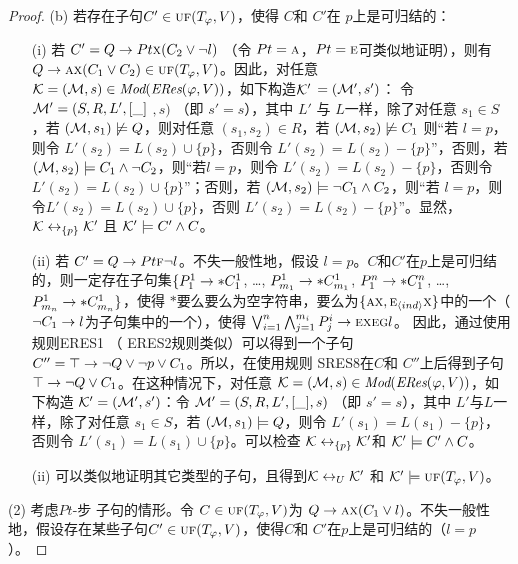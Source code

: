 \begin{proof}
	(b) 若存在子句$C'\in \textsc{uf}(T_\varphi,V)$，使得 $C$和 $C'$在 $p$上是可归结的：
	\begin{itemize}
		\item[(i)] 若 $C'= Q\rightarrow Pt \textsc{x} (C_2 \vee \neg l)$ （令 $Pt=\textsc{a}$，$Pt = \textsc{e}$可类似地证明），则有$Q\rightarrow \textsc{a} \textsc{x}(C_1 \vee C_2) \in \textsc{uf}(T_\varphi,V)$。因此，对任意 ${\cal K}=({\cal M}, s)\in \textit{Mod}(\emph{ERes}(\varphi,V))$，如下构造${\cal K}'$ $=({\cal M}',s')$： 令 ${\cal M}'= (S, R, L',[\_]$ $,s)$ （即 $s'=s$），其中 $L'$ 与 $L$一样，除了对任意 $s_1\in S$，若 $({\cal M}, s_1) \not \models Q$，则对任意 $(s_1, s_2) \in R$，若 $({\cal M}, s_2) \not \models C_1$ 则“若 $l=p$，则令 $L'(s_2) = L(s_2) \cup \{p\}$，否则令 $L'(s_2) = L(s_2) - \{p\}$”，否则，若$({\cal M}, s_2) \models  C_1 \wedge \neg C_2$，则“若$l=p$，则令 $L'(s_2) = L(s_2) - \{p\}$，否则令$L'(s_2) = L(s_2) \cup \{p\}$”；否则，若 $({\cal M}, s_2) \models \neg C_1 \wedge C_2$，则“若 $l=p$，则令$L'(s_2) = L(s_2) \cup \{p\}$，否则 $L'(s_2) = L(s_2) - \{p\}$”。显然， ${\cal K} \leftrightarrow_{\{p\}} {\cal K}'$ 且 ${\cal K}' \models C' \wedge C$。
		\item[(ii)] 若 $C' =  Q\rightarrow Pt \textsc{f} \neg l$。不失一般性地，假设 $l=p$。$C$和$C'$在$p$上是可归结的，则一定存在子句集$\{P_1^1 \rightarrow * C_1^1$, \dots, $P_{m_1}^1 \rightarrow * C_{m_1}^1$, $P_1^n \rightarrow * C_1^n$, \dots, $P_{m_n}^1 \rightarrow * C_{m_n}^1 \}$，使得  $*$要么要么为空字符串，要么为$\{\textsc{a} \textsc{x}, \textsc{e}_{{\langle{ind}\rangle}} \textsc{x}\}$中的一个（$\neg C_1 \rightarrow l$为子句集中的一个），使得 $\bigvee_{i=1}^n \bigwedge_{j=1}^{m_i} P_j^i \rightarrow \textsc{e} \textsc{x} \textsc{e} \textsc{g} l$。
		因此，通过使用规则ERES1 （ ERES2规则类似）可以得到一个子句 $C''=\top \rightarrow \neg Q \vee \neg p \vee C_1$。所以，在使用规则 SRES8在$C$和 $C''$上后得到子句$\top \rightarrow \neg Q \vee C_1$。在这种情况下，对任意 ${\cal K}=({\cal M}, s)\in \textit{Mod}(\emph{ERes}(\varphi,V))$，如下构造 ${\cal K}'=({\cal M}',s')$：令 ${\cal M}'= (S, R, L', [\_],s)$ （即 $s'=s$），其中 $L'$与$L$一样，除了对任意 $s_1\in S$，若 $({\cal M}, s_1) \models Q$，则令 $L'(s_1) = L(s_1) - \{p\}$，否则令 $L'(s_1) = L(s_1) \cup \{p\}$。可以检查 ${\cal K} \leftrightarrow_{\{p\}} {\cal K}'$和 ${\cal K}' \models C' \wedge C$。
		\item[(ii)] 可以类似地证明其它类型的子句，且得到${\cal K} \leftrightarrow_{U} {\cal K}'$ 和 ${\cal K}' \models \textsc{uf}(T_\varphi,V)$。
	\end{itemize}
	
	(2) 考虑$Pt$-步 子句的情形。令 $C\in \textsc{uf}(T_\varphi,V)$为 $Q \rightarrow \textsc{a} \textsc{x}(C_1 \vee  l)$。不失一般性地，假设存在某些子句$C'\in \textsc{uf}(T_\varphi,V)$，使得$C$和 $C'$在$p$上是可归结的（$l=p$）。
	

\end{proof}
